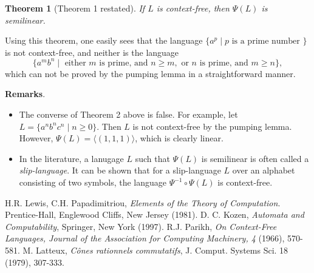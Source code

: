 \documentclass[12pt]{article}
\newtheorem{thm}{Theorem}
\begin{document}
\begin{thm}[Theorem 1 restated] If $L$ is context-free, then $\Psi(L)$ is semilinear. \end{thm}

Using this theorem, one easily sees that the language $\lbrace a^p \mid p \text{ is a prime number } \rbrace$ is not context-free, and neither is the language $$\lbrace a^m b^n \mid \mbox{ either }m\mbox{ is prime, and }n\ge m,\mbox{ or }n\mbox{ is prime, and }m\ge n\rbrace,$$ which can not be proved by the pumping lemma in a straightforward manner.

\textbf{Remarks}.  
\begin{itemize}
\item The converse of Theorem 2 above is false.  For example, let $L=\lbrace a^nb^nc^n \mid n\ge 0\rbrace$.  Then $L$ is not context-free by the pumping lemma.  However, $\Psi(L)=\langle (1,1,1)\rangle$, which is clearly linear.
\item In the literature, a lanugage $L$ such that $\Psi(L)$ is semilinear is often called a \emph{slip-language}.  It can be shown that for a slip-language $L$ over an alphabet consisting of two symbols, the language $\Psi^{-1}\circ \Psi(L)$ is context-free.
\end{itemize}

\begin{thebibliography}{9}
 H.R. Lewis, C.H. Papadimitriou, {\em Elements of the Theory of Computation}. Prentice-Hall, Englewood Cliffs, New Jersey (1981).
 D. C. Kozen, {\em Automata and Computability}, Springer, New York (1997).
 R.J. Parikh, {\em On Context-Free Languages, Journal of the Association for Computing Machinery, 4} (1966), 570-581.
 M. Latteux, {\em C\^{o}nes rationnels commutatifs}, J. Comput. Systems Sci. 18 (1979), 307-333.
\end{thebibliography}
\end{document}
